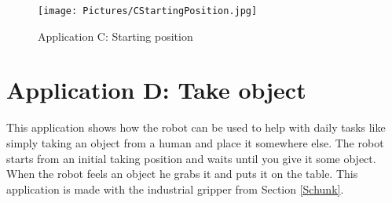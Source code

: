 \documentclass[11pt,a4paper]{report}
\begin{document}
\begin{figure}[!ht]
	\centering
	\texttt{[image: Pictures/CStartingPosition.jpg]}
	\caption{Application C: Starting position}
	\label{fig:CStartingPosition}
\end{figure}
\newpage

\section{Application D: Take object}
This application shows how the robot can be used to help with daily tasks like simply taking an object from a human and place it somewhere else. The robot starts from an initial taking position and waits until you give it some object. When the robot feels an object he grabs it and puts it on the table. This application is made with the industrial gripper from Section \ref{Schunk}.
\end{document}
